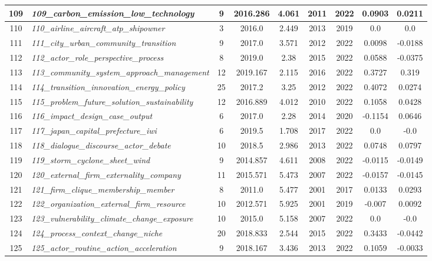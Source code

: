 \documentclass[12pt]{article}
\begin{document}
\begin{landscape}
\begin{scriptsize}
\begin{longtable}{|>{\scriptsize}c|p{6cm}|c|c|c|c|c|c|c|}
109 & \textit{109\_carbon\_emission\_low\_technology} & 9 & 2016.286 & 4.061 & 2011 & 2022 & 0.0903 & 0.0211 \\ \hline
110 & \textit{110\_airline\_aircraft\_atp\_shipowner} & 3 & 2016.0 & 2.449 & 2013 & 2019 & 0.0 & 0.0 \\ \hline
111 & \textit{111\_city\_urban\_community\_transition} & 9 & 2017.0 & 3.571 & 2012 & 2022 & 0.0098 & -0.0188 \\ \hline
112 & \textit{112\_actor\_role\_perspective\_process} & 8 & 2019.0 & 2.38 & 2015 & 2022 & 0.0588 & -0.0375 \\ \hline
113 & \textit{113\_community\_system\_approach\_management} & 12 & 2019.167 & 2.115 & 2016 & 2022 & 0.3727 & 0.319 \\ \hline
114 & \textit{114\_transition\_innovation\_energy\_policy} & 25 & 2017.2 & 3.25 & 2012 & 2022 & 0.4072 & 0.0274 \\ \hline
115 & \textit{115\_problem\_future\_solution\_sustainability} & 12 & 2016.889 & 4.012 & 2010 & 2022 & 0.1058 & 0.0428 \\ \hline
116 & \textit{116\_impact\_design\_case\_output} & 6 & 2017.0 & 2.28 & 2014 & 2020 & -0.1154 & 0.0646 \\ \hline
117 & \textit{117\_japan\_capital\_prefecture\_iwi} & 6 & 2019.5 & 1.708 & 2017 & 2022 & 0.0 & -0.0 \\ \hline
118 & \textit{118\_dialogue\_discourse\_actor\_debate} & 10 & 2018.5 & 2.986 & 2013 & 2022 & 0.0748 & 0.0797 \\ \hline
119 & \textit{119\_storm\_cyclone\_sheet\_wind} & 9 & 2014.857 & 4.611 & 2008 & 2022 & -0.0115 & -0.0149 \\ \hline
120 & \textit{120\_external\_firm\_externality\_company} & 11 & 2015.571 & 5.473 & 2007 & 2022 & -0.0157 & -0.0145 \\ \hline
121 & \textit{121\_firm\_clique\_membership\_member} & 8 & 2011.0 & 5.477 & 2001 & 2017 & 0.0133 & 0.0293 \\ \hline
122 & \textit{122\_organization\_external\_firm\_resource} & 10 & 2012.571 & 5.925 & 2001 & 2019 & -0.007 & 0.0092 \\ \hline
123 & \textit{123\_vulnerability\_climate\_change\_exposure} & 10 & 2015.0 & 5.158 & 2007 & 2022 & 0.0 & -0.0 \\ \hline
124 & \textit{124\_process\_context\_change\_niche} & 20 & 2018.833 & 2.544 & 2015 & 2022 & 0.3433 & -0.0442 \\ \hline
125 & \textit{125\_actor\_routine\_action\_acceleration} & 9 & 2018.167 & 3.436 & 2013 & 2022 & 0.1059 & -0.0033 \\ \hline

\end{longtable}
\end{scriptsize}
\end{landscape}
\end{document}
